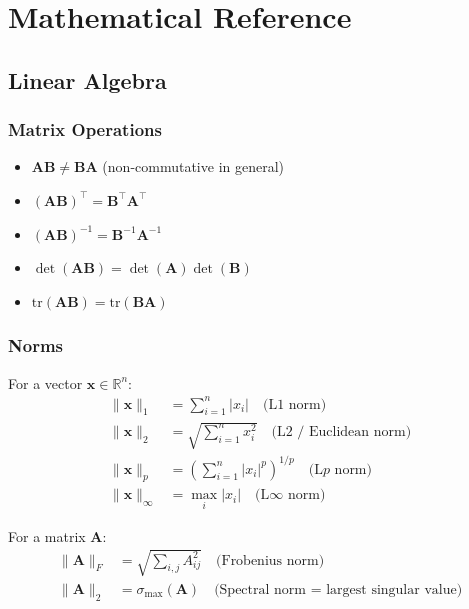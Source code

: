 %

\appendix

\chapter{Mathematical Reference}

\section{Linear Algebra}

\subsection{Matrix Operations}

\begin{itemize}
    \item $\mathbf{AB} \neq \mathbf{BA}$ (non-commutative in general)
    \item $(\mathbf{AB})^\top = \mathbf{B}^\top\mathbf{A}^\top$
    \item $(\mathbf{AB})^{-1} = \mathbf{B}^{-1}\mathbf{A}^{-1}$
    \item $\det(\mathbf{AB}) = \det(\mathbf{A})\det(\mathbf{B})$
    \item $\text{tr}(\mathbf{AB}) = \text{tr}(\mathbf{BA})$
\end{itemize}

\subsection{Norms}

For a vector $\mathbf{x} \in \mathbb{R}^n$:
\begin{align}
\|\mathbf{x}\|_1 &= \sum_{i=1}^{n} |x_i| \quad \text{(L1 norm)} \\
\|\mathbf{x}\|_2 &= \sqrt{\sum_{i=1}^{n} x_i^2} \quad \text{(L2 / Euclidean norm)} \\
\|\mathbf{x}\|_p &= \left(\sum_{i=1}^{n} |x_i|^p\right)^{1/p} \quad \text{(L$p$ norm)} \\
\|\mathbf{x}\|_\infty &= \max_i |x_i| \quad \text{(L$\infty$ norm)}
\end{align}

For a matrix $\mathbf{A}$:
\begin{align}
\|\mathbf{A}\|_F &= \sqrt{\sum_{i,j} A_{ij}^2} \quad \text{(Frobenius norm)} \\
\|\mathbf{A}\|_2 &= \sigma_{\max}(\mathbf{A}) \quad \text{(Spectral norm = largest singular value)}
\end{align}

